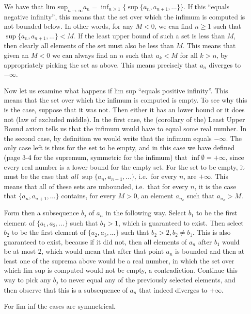 \begin{solution}

    We have that $\text{lim sup}_{n \rightarrow \infty} a_n = \inf_{n \geq 1}\{\sup\{a_n, a_{n+1}, \ldots\}\}$. If this ``equals negative infinity'', this means that the set over which the infimum is computed is not bounded below. In other words, for any $M < 0$, we can find $n \geq 1$ such that $\sup\{a_n, a_{n+1}, \ldots\} < M$. If the least upper bound of such a set is less than $M$, then clearly all elements of the set must also be less than $M$. This means that given an $M < 0$ we can always find an $n$ such that $a_k < M$ for all $k > n$, by appropriately picking the set as above. This means precisely that $a_n$ diverges to $-\infty$.

    Now let us examine what happens if lim sup ``equals positive infinity''. This means that the set over which the infimum is computed is empty. To see why this is the case, suppose that it was not. Then either it has an lower bound or it does not (law of excluded middle). In the first case, the (corollary of the) Least Upper Bound axiom tells us that the infimum would have to equal some real number. In the second case, by definition we would write that the infimum equals $-\infty$. The only case left is thus for the set to be empty, and in this case we have defined (page 3-4 for the supremum, symmetric for the infimum) that $\inf \emptyset = +\infty$, since every real number is a lower bound for the empty set. For the set to be empty, it must be the case that \textit{all} $\sup\{a_n, a_{n+1}, \ldots\}$, i.e.\ for every $n$, are $+\infty$. This means that all of these sets are unbounded, i.e.\ that for every $n$, it is the case that $\{a_n, a_{n+1}, \ldots\}$ contains, for every $M > 0$, an element $a_{n_k}$ such that $a_{n_k} > M$. 
    
    Form then a subsequence $b_j$ of $a_n$ in the following way. Select $b_1$ to be the first element of $\{a_1, a_2, \ldots\}$ such that $b_1 > 1$, which is guaranteed to exist. Then select $b_2$ to be the first element of $\{a_2, a_3, \ldots\}$ such that $b_2 > 2, b_2 \neq b_1$. This is also guaranteed to exist, because if it did not, then all elements of $a_n$ after $b_1$ would be at most 2, which would mean that after that point $a_n$ is bounded and then at least one of the suprema above would be a real number, in which the set over which lim sup is computed would not be empty, a contradiction. Continue this way to pick any $b_j$ to never equal any of the previously selected elements, and then observe that this is a subsequence of $a_n$ that indeed diverges to $+\infty$.

    For lim inf the cases are symmetrical.
\end{solution}

